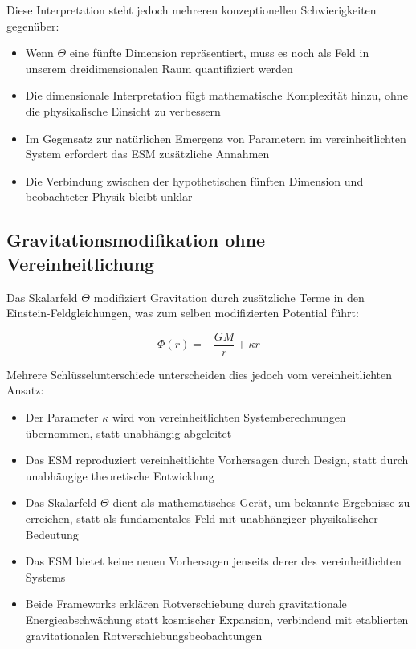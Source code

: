 	Diese Interpretation steht jedoch mehreren konzeptionellen Schwierigkeiten gegenüber:
	
	\begin{itemize}
		\item Wenn $\Theta$ eine fünfte Dimension repräsentiert, muss es noch als Feld in unserem dreidimensionalen Raum quantifiziert werden
		\item Die dimensionale Interpretation fügt mathematische Komplexität hinzu, ohne die physikalische Einsicht zu verbessern
		\item Im Gegensatz zur natürlichen Emergenz von Parametern im vereinheitlichten System erfordert das ESM zusätzliche Annahmen
		\item Die Verbindung zwischen der hypothetischen fünften Dimension und beobachteter Physik bleibt unklar
	\end{itemize}
	
	\subsection{Gravitationsmodifikation ohne Vereinheitlichung}
	\label{subsec:gravitational_modification_esm}
	
	Das Skalarfeld $\Theta$ modifiziert Gravitation durch zusätzliche Terme in den Einstein-Feldgleichungen, was zum selben modifizierten Potential führt:
	
	\begin{equation}
		\Phi(r) = -\frac{GM}{r} + \kappa r
	\end{equation}
	
	Mehrere Schlüsselunterschiede unterscheiden dies jedoch vom vereinheitlichten Ansatz:
	
	\begin{itemize}
		\item Der Parameter $\kappa$ wird von vereinheitlichten Systemberechnungen übernommen, statt unabhängig abgeleitet
		\item Das ESM reproduziert vereinheitlichte Vorhersagen durch Design, statt durch unabhängige theoretische Entwicklung
		\item Das Skalarfeld $\Theta$ dient als mathematisches Gerät, um bekannte Ergebnisse zu erreichen, statt als fundamentales Feld mit unabhängiger physikalischer Bedeutung
		\item Das ESM bietet keine neuen Vorhersagen jenseits derer des vereinheitlichten Systems
		\item Beide Frameworks erklären Rotverschiebung durch gravitationale Energieabschwächung statt kosmischer Expansion, verbindend mit etablierten gravitationalen Rotverschiebungsbeobachtungen
	\end{itemize}
	
